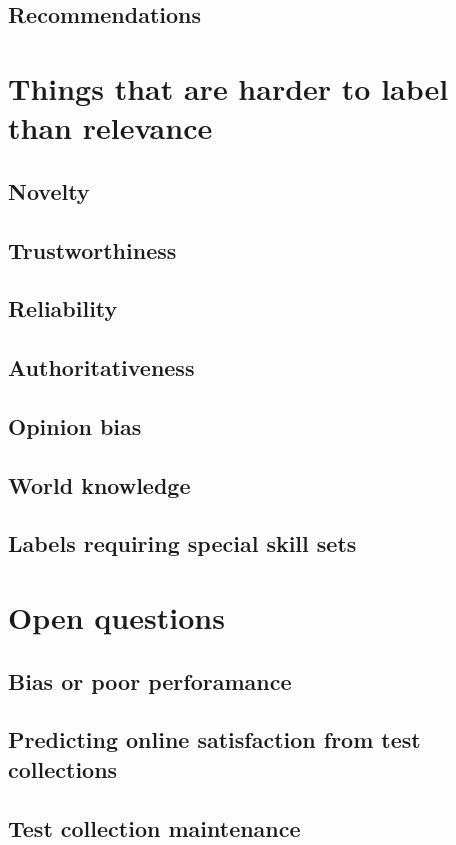 \documentclass[nobib]{tufte-book}
\begin{document}
\section{Recommendations}

\chapter{Things that are harder to label than relevance}

\section{Novelty}
\section{Trustworthiness}
\section{Reliability}
\section{Authoritativeness}
\section{Opinion bias}
\section{World knowledge}
\section{Labels requiring special skill sets}

\chapter{Open questions}

\section{Bias or poor perforamance}
\section{Predicting online satisfaction from test collections}
\section{Test collection maintenance}
\end{document}
